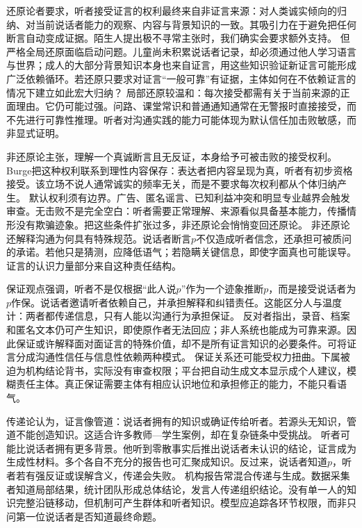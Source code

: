 还原论者要求，听者接受证言的权利最终来自非证言来源：对人类诚实倾向的归纳、对当前说话者能力的观察、内容与背景知识的一致。其吸引力在于避免把任何断言自动变成证据。陌生人提出极不寻常主张时，我们确实会要求额外支持。 但严格全局还原面临启动问题。儿童尚未积累说话者记录，却必须通过他人学习语言与世界；成人的大部分背景知识本身也来自证言，用这些知识验证新证言可能形成广泛依赖循环。若还原只要求对证言“一般可靠”有证据，主体如何在不依赖证言的情况下建立如此宏大归纳？ 局部还原较温和：每次接受都需有关于当前来源的正面理由。它仍可能过强。问路、课堂常识和普通通知通常在无警报时直接接受，而不先进行可靠性推理。听者对沟通实践的能力可能体现为默认信任加击败敏感，而非显式证明。

非还原论主张，理解一个真诚断言且无反证，本身给予可被击败的接受权利。Burge把这种权利联系到理性内容保存：表达者把内容呈现为真，听者有初步资格接受\parencite{burge1993}。该立场不说人通常诚实的频率无关，而是不要求每次权利都从个体归纳产生。 默认权利须有边界。广告、匿名谣言、已知利益冲突和明显专业越界会触发审查。无击败不是完全空白：听者需要正常理解、来源看似具备基本能力，传播情形没有欺骗迹象。把这些条件扩张过多，非还原论会悄悄变回还原论。 非还原论还解释沟通为何具有特殊规范。说话者断言$p$不仅造成听者信念，还承担可被质问的承诺。若他只是猜测，应降低语气；若隐瞒关键信息，即使字面真也可能误导。证言的认识力量部分来自这种责任结构。

保证观点强调，听者不是仅根据“此人说$p$”作为一个迹象推断$p$，而是接受说话者为$p$作保。说话者邀请听者依赖自己，并承担解释和纠错责任。这能区分人与温度计：两者都传递信息，只有人能以沟通行为承担保证。 反对者指出，录音、档案和匿名文本仍可产生知识，即使原作者无法回应；非人系统也能成为可靠来源。因此保证或许解释面对面证言的特殊价值，却不是所有证言知识的必要条件。可将证言分成沟通性信任与信息性依赖两种模式。 保证关系还可能受权力扭曲。下属被迫为机构结论背书，实际没有审查权限；平台把自动生成文本显示成个人建议，模糊责任主体。真正保证需要主体有相应认识地位和承担修正的能力，不能只看语气。

传递论认为，证言像管道：说话者拥有的知识或确证传给听者。若源头无知识，管道不能创造知识。这适合许多教师—学生案例，却在复杂链条中受挑战。 听者可能比说话者拥有更多背景。他听到零散事实后推出说话者未认识的结论，证言成为生成性材料。多个各自不充分的报告也可汇聚成知识。反过来，说话者知道$p$，听者若有强反证或误解含义，传递会失败。 机构报告常混合传递与生成。数据采集者知道局部结果，统计团队形成总体结论，发言人传递组织结论。没有单一人的知识完整沿链移动，但机制可产生群体和听者知识。模型应追踪各环节权限，而非只问第一位说话者是否知道最终命题。


